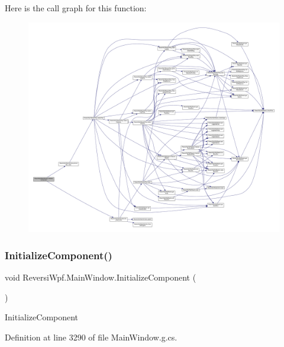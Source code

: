 Here is the call graph for this function\+:
\nopagebreak
\begin{figure}[H]
\begin{center}
\leavevmode
\includegraphics[width=350pt]{class_reversi_wpf_1_1_main_window_a4cf9bc92cee02fa8e3b00fa56fb41c82_cgraph}
\end{center}
\end{figure}
\mbox{\label{class_reversi_wpf_1_1_main_window_a4cf9bc92cee02fa8e3b00fa56fb41c82}} 
\subsubsection{\texorpdfstring{Initialize\+Component()}{InitializeComponent()}\hspace{0.1cm}{\footnotesize\ttfamily [2/4]}}
{\footnotesize\ttfamily void Reversi\+Wpf.\+Main\+Window.\+Initialize\+Component (\begin{DoxyParamCaption}{ }\end{DoxyParamCaption})}



Initialize\+Component 



Definition at line 3290 of file Main\+Window.\+g.\+cs.

